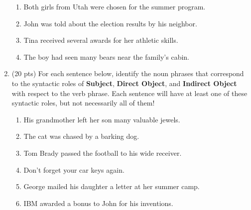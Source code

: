 \documentclass[11pt]{article}
\begin{document}
\begin{enumerate}
\begin{enumerate}
\item Both girls from Utah were chosen for the summer program.
\vspace*{.5in}

\item John was told about the election results by his neighbor.
\vspace*{.5in}

\item Tina received several awards for her athletic skills.
\vspace*{.5in}

\item The boy had seen many bears near the family's cabin.
\vspace*{.5in}

\end{enumerate}



\newpage

\item (20 pts) For each sentence below, identify the noun phrases that
  correspond to the syntactic roles of {\bf Subject}, {\bf Direct Object}, and
  {\bf Indirect Object} with respect to the verb phrase. Each sentence will have at
  least one of these syntactic roles, but not necessarily all of them!

\begin{enumerate}

\item His grandmother left her son many valuable jewels.
\vspace*{.5in}

\item The cat was chased by a barking dog.
\vspace*{.5in}

\item Tom Brady passed the football to his wide receiver.
\vspace*{.5in}

\item Don't forget your car keys again.
\vspace*{.5in}

\item George mailed his daughter a letter at her summer camp. 
\vspace*{.5in}

\item IBM awarded a bonus to John for his inventions.
\vspace*{.5in}


\end{enumerate}
\end{enumerate}
\end{document}
